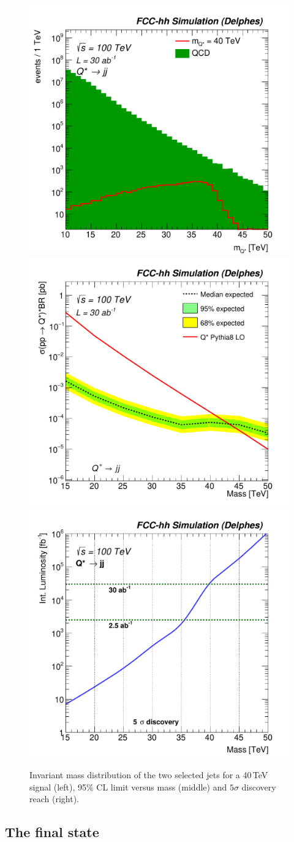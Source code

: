 \documentclass[a4paper,11pt]{article}
\begin{document}
\begin{figure}[!htb]
  \centering
  \includegraphics[width=0.32\columnwidth]{Fig/Mj1j2_pf04_sel1_nostack_log-eps-converted-to.pdf}
  \includegraphics[width=0.32\columnwidth]{Fig/lim_Qstar_jj_fcc_v02-eps-converted-to.pdf}
  \includegraphics[width=0.32\columnwidth]{Fig/DiscoveryPotential_jj_rootStyle-eps-converted-to.pdf}
   \caption{Invariant mass distribution of the two selected jets for a 40\,TeV signal (left), 95\% CL limit versus mass (middle) and $5\sigma$ discovery reach (right).}
  \label{figure:hadronicresonances:jj}
\end{figure}

\subsection{The \texorpdfstring{\ttbar}{tt} final state}
\label{sec:hadtt}
\end{document}
